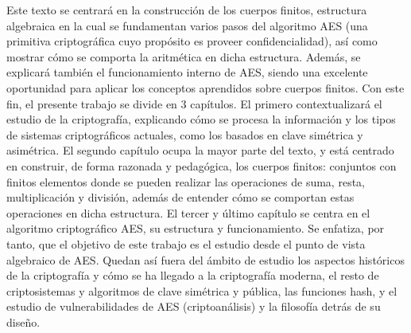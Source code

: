 Este texto se centrará en la construcción de los cuerpos finitos, estructura algebraica en la cual se fundamentan varios pasos del algoritmo AES (una primitiva criptográfica cuyo propósito es proveer confidencialidad), así como mostrar cómo se comporta la aritmética en dicha estructura. Además, se explicará también el funcionamiento interno de AES, siendo una excelente oportunidad para aplicar los conceptos aprendidos sobre cuerpos finitos. Con este fin, el presente trabajo se divide en 3 capítulos. El primero contextualizará el estudio de la criptografía, explicando cómo se procesa la información y los tipos de sistemas criptográficos actuales, como los basados en clave simétrica y asimétrica. El segundo capítulo ocupa la mayor parte del texto, y está centrado en construir, de forma razonada y pedagógica, los cuerpos finitos: conjuntos con finitos elementos donde se pueden realizar las operaciones de suma, resta, multiplicación y división, además de entender cómo se comportan estas operaciones en dicha estructura. El tercer y último capítulo se centra en el algoritmo criptográfico AES, su estructura y funcionamiento. Se enfatiza, por tanto, que el objetivo de este trabajo es el estudio desde el punto de vista algebraico de AES. Quedan así fuera del ámbito de estudio los aspectos históricos de la criptografía y cómo se ha llegado a la criptografía moderna, el resto de criptosistemas y algoritmos de clave simétrica y pública, las funciones hash, y el estudio de vulnerabilidades de AES (criptoanálisis) y la filosofía detrás de su diseño.


